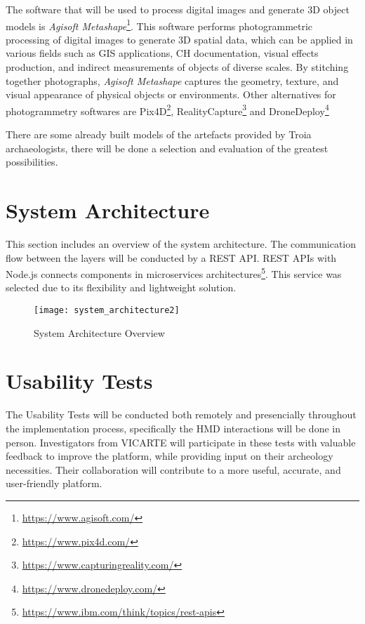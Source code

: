 The software that will be used to process digital images and generate \gls{3D} object models is \textit{Agisoft Metashape}\footnote{\url{https://www.agisoft.com/}}.
This software performs photogrammetric processing of digital images to generate \gls{3D} spatial data, which can be applied in various fields such as \gls{GIS} applications, \gls{CH} documentation, visual effects production, and indirect measurements of objects of diverse scales. 
By stitching together photographs, \textit{Agisoft Metashape} captures the geometry, texture, and visual appearance of physical objects or environments.
Other alternatives for photogrammetry softwares are Pix4D\footnote{\url{https://www.pix4d.com/}}, RealityCapture\footnote{\url{https://www.capturingreality.com/}} and DroneDeploy\footnote{\url{https://www.dronedeploy.com/}}

There are some already built models of the artefacts provided by Troia archaeologists, there will be done a selection and evaluation of the greatest possibilities.


\section{System Architecture}
\label{sec:architecture}

This section includes an overview of the system architecture. The communication flow between the layers will be conducted by a REST \gls{API}.
REST \glspl{API} with Node.js connects components in microservices architectures\footnote{\url{https://www.ibm.com/think/topics/rest-apis}}.
This service was selected due to its flexibility and lightweight solution. 

\begin{figure}[h!]
\centering
\texttt{[image: system\_architecture2]}
\caption{System Architecture Overview}
\label{fig:architecture}
\end{figure}
\FloatBarrier

\section{Usability Tests}
\label{sec:usability_tests}

The Usability Tests will be conducted both remotely and presencially throughout the implementation process, specifically the \gls{HMD} interactions will be done in person.
Investigators from \gls{VICARTE} will participate in these tests with valuable feedback to improve the platform, while providing input on their archeology necessities. Their collaboration will contribute to a more useful, accurate, and user-friendly platform.

